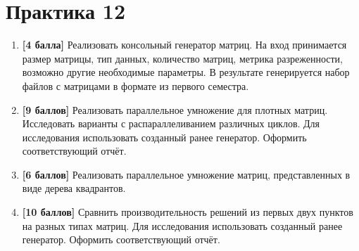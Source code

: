 \section{Практика 12}

\begin{enumerate}

    \item \textbf{[4 балла]} Реализовать консольный генератор матриц. На вход принимается размер матрицы, тип данных, количество матриц, метрика разреженности, возможно другие необходимые параметры. В результате генерируется набор файлов с матрицами в формате из первого семестра. 
    \item \textbf{[9 баллов]} Реализовать параллельное умножение для плотных матриц. Исследовать варианты с распараллеливанием различных циклов. Для исследования использовать созданный ранее генератор. Оформить соответствующий отчёт.
    \item \textbf{[6 баллов]} Реализовать параллельное умножение матриц, представленных в виде дерева квадрантов.
    \item \textbf{[10 баллов]} Сравнить производительность решений из первых двух пунктов на разных типах матриц. Для исследования использовать созданный ранее генератор. Оформить соответствующий отчёт. 
    
\end{enumerate}

